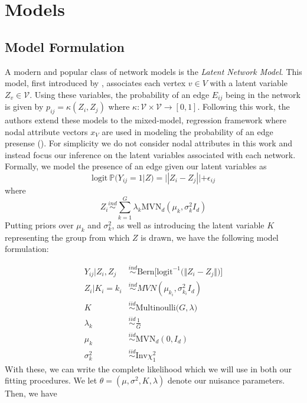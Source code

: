 \documentclass{article}
\begin{document}
\section{Models} \label{Models}


\subsection{Model Formulation}\label{Model Formulation}

A modern and popular class of network models is the \textit{Latent Network Model}. This model, first introduced by \cite{Hoff2002}, associates each vertex $v\in V$ with a latent variable $Z_v\in \mathcal{V}$. Using these variables, the probability of an edge $E_{ij}$ being in the network is given by $p_{ij} = \kappa(Z_i, Z_j)$ where $\kappa:\mathcal{V}\times\mathcal{V}\to[0,1]$. Following this work, the authors extend these models to the mixed-model, regression framework where nodal attribute vectors $x_V$ are used in modeling the probability of an edge presense (\cite{KRIVITSKY2009204}). For simplicity we do not consider nodal attributes in this work and instead focus our inference on the latent variables associated with each network. Formally, we model the presence of an edge given our latent variables as
\[\text{logit} \ \mathbb{P}(Y_{ij} = 1|Z) = ||Z_i - Z_j|| + \epsilon_{ij}\]
where
\[Z_i \overset{ind}{\sim}\sum_{k=1}^G \lambda_k\text{MVN}_d(\mu_k,\sigma_k^2I_d)\]
Putting priors over $\mu_k$ and  $\sigma_k^2$, as well as introducing the latent variable $K$ representing the group from which $Z$ is drawn, we have the following model formulation:

\begin{align*}
Y_{ij} | Z_i, Z_j &\overset{ind}\sim \text{Bern}\Big[\text{logit}^{-1}\big(\Vert Z_i - Z_j \Vert\big)\Big] \\
Z_i | K_i = k_i &\overset{ind}\sim MVN(\mu_{k_i}, \sigma_{k_i}^2 I_d) \\
K &\overset{iid}\sim \text{Multinoulli}\big(G, \lambda \big) \\
\lambda_k &\overset{iid}\sim \frac{1}{G} \\
\mu_k &\overset{iid}\sim \text{MVN}_d(0, I_d) \\
\sigma_k^2 &\overset{iid}\sim \text{Inv} \chi^2_1
\end{align*}
With these, we can write the complete likelihood which we will use in both our fitting procedures. We let $\theta = (\mu, \sigma^2, K, \lambda)$ denote our nuisance parameters. Then, we have
\end{document}
